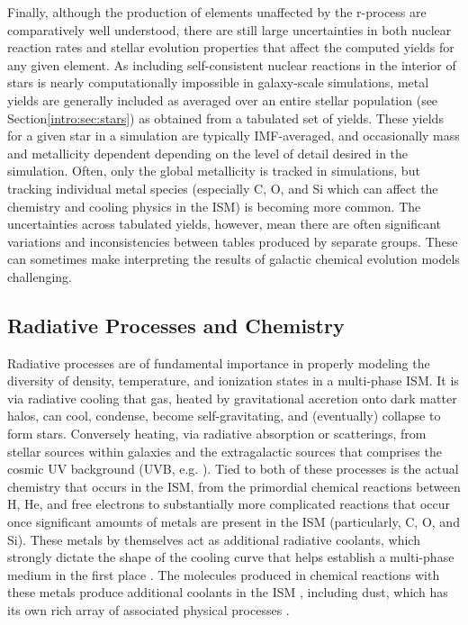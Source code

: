 Finally, although the production of elements unaffected by the r-process are comparatively well understood, there are still large uncertainties in both nuclear reaction rates and stellar evolution properties that affect the computed yields for any given element. As including self-consistent nuclear reactions in the interior of stars is nearly computationally impossible in galaxy-scale simulations, metal yields are generally included as averaged over an entire stellar population (see Section\ref{intro:sec:stars}) as obtained from a tabulated set of yields. These yields for a given star in a simulation are typically IMF-averaged, and occasionally mass and metallicity dependent depending on the level of detail desired in the simulation. Often, only the global metallicity is tracked in simulations, but tracking individual metal species (especially C, O, and Si which can affect the chemistry and cooling physics in the ISM) is becoming more common. The uncertainties across tabulated yields, however, mean there are often significant variations and inconsistencies between tables produced by separate groups. These can sometimes make interpreting the results of galactic chemical evolution models challenging.

\subsection{Radiative Processes and Chemistry}
\label{intro:sec:cooling}

Radiative processes are of fundamental importance in properly modeling the diversity of density, temperature, and ionization states in a multi-phase ISM. It is via radiative cooling that gas, heated by gravitational accretion onto dark matter halos, can cool, condense, become self-gravitating, and (eventually) collapse to form stars. Conversely heating, via radiative absorption or scatterings, from stellar sources within galaxies and the extragalactic sources that comprises the cosmic UV background (UVB, e.g. \cite{HM2001,HM2012,FG2011}). Tied to both of these processes is the actual chemistry that occurs in the ISM, from the primordial chemical reactions between H, He, and free electrons to substantially more complicated reactions that occur once significant amounts of metals are present in the ISM (particularly, C, O, and Si). These metals by themselves act as additional radiative coolants, which strongly dictate the shape of the cooling curve that helps establish a multi-phase medium in the first place \citep[e.g.][]{McKeeOstriker1977}. The molecules produced in chemical reactions with these metals produce additional coolants in the ISM \citep{HollenbackMcKee1979}, including dust, which has its own rich array of associated physical processes \citep{Omukai2000,Omukai2005,Draine2011}.

